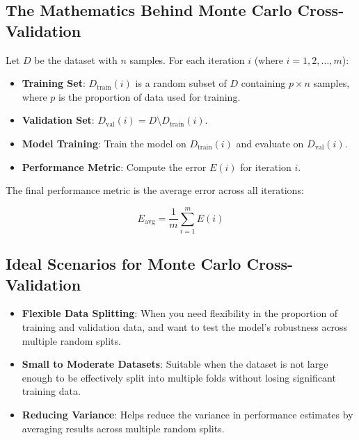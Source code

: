 \documentclass[10pt]{article}
\begin{document}
\subsection{The Mathematics Behind Monte Carlo Cross-Validation}
Let \(D\) be the dataset with \(n\) samples. For each iteration \(i\) (where \(i=1,2,\dots,m\)):

\begin{itemize}
    \item \textbf{Training Set}: \(D_{\text{train}}(i)\) is a random subset of \(D\) containing \(p \times n\) samples, where \(p\) is the proportion of data used for training.
    \item \textbf{Validation Set}: \(D_{\text{val}}(i) = D \setminus D_{\text{train}}(i)\).
    \item \textbf{Model Training}: Train the model on \(D_{\text{train}}(i)\) and evaluate on \(D_{\text{val}}(i)\).
    \item \textbf{Performance Metric}: Compute the error \(E(i)\) for iteration \(i\).
\end{itemize}

The final performance metric is the average error across all iterations:

\[
E_{\text{avg}} = \frac{1}{m} \sum_{i=1}^{m} E(i)
\]

\subsection{Ideal Scenarios for Monte Carlo Cross-Validation}
\begin{itemize}
    \item \textbf{Flexible Data Splitting}: When you need flexibility in the proportion of training and validation data, and want to test the model’s robustness across multiple random splits.
    \item \textbf{Small to Moderate Datasets}: Suitable when the dataset is not large enough to be effectively split into multiple folds without losing significant training data.
    \item \textbf{Reducing Variance}: Helps reduce the variance in performance estimates by averaging results across multiple random splits.
\end{itemize}
\end{document}
